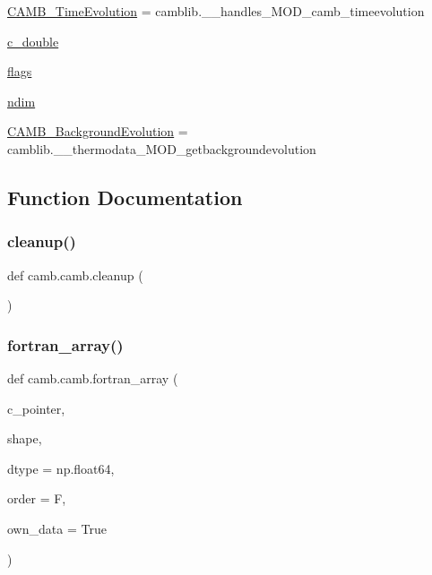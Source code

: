 \begin{DoxyCompactItemize}
\mbox{\hyperlink{namespacecamb_1_1camb_ac9db1375b942cb06a077ed82375666e2}{C\+A\+M\+B\+\_\+\+Time\+Evolution}} = camblib.\+\_\+\+\_\+handles\+\_\+\+M\+O\+D\+\_\+camb\+\_\+timeevolution
\item 
\mbox{\hyperlink{namespacecamb_1_1camb_a9bb9b4d27cefdc5b8d0c9ecf508462cf}{c\+\_\+double}}
\item 
\mbox{\hyperlink{namespacecamb_1_1camb_aa84470703add02037beda61ea31c02e9}{flags}}
\item 
\mbox{\hyperlink{namespacecamb_1_1camb_a1ab298aa884f117a7e6b56a81f694806}{ndim}}
\item 
\mbox{\hyperlink{namespacecamb_1_1camb_a5b8aeb14d2331907199edb107b6cf588}{C\+A\+M\+B\+\_\+\+Background\+Evolution}} = camblib.\+\_\+\+\_\+thermodata\+\_\+\+M\+O\+D\+\_\+getbackgroundevolution
\end{DoxyCompactItemize}


\subsection{Function Documentation}
\mbox{\label{namespacecamb_1_1camb_a7ec5678be1930724bb5a1a179d51ae89}} 
\subsubsection{\texorpdfstring{cleanup()}{cleanup()}}
{\footnotesize\ttfamily def camb.\+camb.\+cleanup (\begin{DoxyParamCaption}{ }\end{DoxyParamCaption})}

\mbox{\label{namespacecamb_1_1camb_aa47148183bb7f90330a1e2f01b1063ff}} 
\subsubsection{\texorpdfstring{fortran\+\_\+array()}{fortran\_array()}}
{\footnotesize\ttfamily def camb.\+camb.\+fortran\+\_\+array (\begin{DoxyParamCaption}\item[{}]{c\+\_\+pointer,  }\item[{}]{shape,  }\item[{}]{dtype = {\ttfamily np.float64},  }\item[{}]{order = {\ttfamily \textquotesingle{}F\textquotesingle{}},  }\item[{}]{own\+\_\+data = {\ttfamily True} }\end{DoxyParamCaption})}



